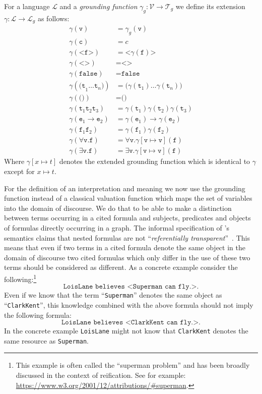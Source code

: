 \begin{definition}
For a language $\mathcal{L}$ and a  \emph{grounding function} $\gamma_g: \mathcal{V}\rightarrow \mathcal{T}_g$ we define its extension
$\gamma:\mathcal{L}\rightarrow \mathcal{L}_g$ as follows: 
\begin{align*}
 \gamma(\texttt{v}) &= \gamma_g(\texttt{v})\\
 \gamma(\texttt{c}) &= c\\
 \gamma(\texttt{<f>}) &= \texttt{<}\gamma(\texttt{f})\texttt{>}\\
 \gamma(\texttt{<>}) &= \texttt{<>}\\
 \gamma(\texttt{false}) &= \texttt{false}\\
 \gamma(\texttt{(t}_1\ldots\texttt{t}_n\texttt{)})&= \texttt{(}\gamma(\texttt{t}_1)\ldots\gamma(\texttt{t}_n)\texttt{)}\\
 \gamma(\texttt{()})&=\texttt{()}\\
 \gamma(\texttt{t}_1\texttt{t}_2\texttt{t}_3) &= \gamma(\texttt{t}_1)\gamma(\texttt{t}_2)\gamma(\texttt{t}_3)\\
 \gamma(\texttt{e}_1\rightarrow \texttt{e}_2) &= \gamma(\texttt{e}_1)\rightarrow\gamma(\texttt{e}_2)\\
 \gamma(\texttt{f}_1\texttt{f}_2) &= \gamma(\texttt{f}_1)\gamma(\texttt{f}_2)\\
 \gamma(\forall \texttt{v}.\texttt{f}) &=  \forall \texttt{v}. \gamma[\texttt{v}\mapsto \texttt{v}](\texttt{f})\\
  \gamma(\exists \texttt{v}.\texttt{f}) &=  \exists \texttt{v}. \gamma[\texttt{v}\mapsto \texttt{v}](\texttt{f})
\end{align*}
Where  $\gamma [x\mapsto t]$ 
 denotes the extended grounding function which is identical to $\gamma$ except for $x\mapsto t$. 
\end{definition}


For the definition of an interpretation and meaning we now use the grounding function instead of a classical 
valuation function which maps the set of variables into the domain of discourse. 
We do that to be able to make a distinction between terms occurring in a cited formula and subjects, predicates and objects of formulas directly occurring in a graph. 
The informal specification of \nthree's semantics 
claims that nested formulas are not ``\emph{referentially transparent}''~\cite[p.7]{N3Logic}. This means that even if two terms  
in a cited formula denote the same object in the domain of 
discourse two cited formulas which only differ in the use of these two terms should be considered as different. 
As a concrete example consider the following:\footnote{This example is often called the ``superman problem'' and has been broadly discussed in the context  of \rdf reification. See for 
example: \url{https://www.w3.org/2001/12/attributions/\#superman}.}
\[
 \texttt{LoisLane believes <Superman can fly.>.}
\]
Even if we know that the term ``\texttt{Superman}'' denotes the same object as ``\texttt{ClarkKent}'', this knowledge combined with the above formula should 
not imply the following formula:
\[
 \texttt{LoisLane believes <ClarkKent can fly.>.}
\]
In the concrete example \texttt{LoisLane} might not know that \texttt{ClarkKent} denotes the same resource as \texttt{Superman}.

